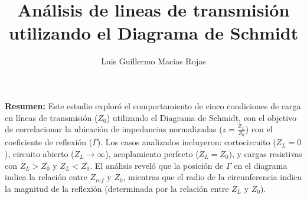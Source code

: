 \documentclass{article}   %
\title{Análisis de lineas de transmisión utilizando el Diagrama de Schmidt}
\author{Luis Guillermo Macias Rojas}
\theoremstyle{mytheoremstyle}
\theoremstyle{mytheoremstyle}
\theoremstyle{myproblemstyle}
\begin{document}
    \maketitle

    \selectfont %
    \noindent
    \textbf{Resumen:} Este estudio exploró el comportamiento de cinco condiciones de carga en líneas de transmisión ($Z_0$) 
    utilizando el Diagrama de Schmidt, con el objetivo de correlacionar la ubicación de impedancias normalizadas ($z = \frac{Z_L}{Z_0}$)
    con el coeficiente de reflexión ($\Gamma$). Los casos analizados incluyeron: cortocircuito ($Z_L = 0$), circuito abierto 
    ($Z_L \to \infty$), acoplamiento perfecto ($Z_L = Z_0$), y cargas resistivas con $Z_L > Z_0$ y $Z_L < Z_0$. El análisis
    reveló que la posición de $\Gamma$ en el diagrama indica la relación entre $Z_{ref}$ y $Z_0$, mientras que el radio de la circunferencia
    indica la magnitud de la reflexión (determinada por la relación entre $Z_L$ y $Z_0$).
\end{document}
